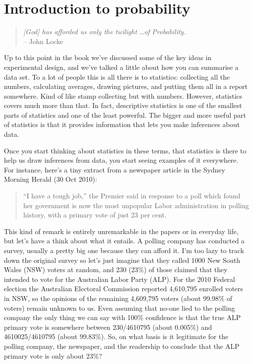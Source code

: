 

\chapter{Introduction to probability\label{ch:probability}}

\begin{quote}
{\it [God] has afforded us only the twilight \ldots of Probability.} \\
\hspace*{2cm} -- John Locke
\end{quote}

\vspace*{12pt}
Up to this point in the book we've discussed some of the key ideas in experimental design, and we've talked a little about how you can summarise a data set.  To a lot of people this is all there is to statistics: collecting all the numbers, calculating averages, drawing pictures, and putting them all in a report somewhere. Kind of like stamp collecting but with numbers. However, statistics covers much more than that. In fact, descriptive statistics is one of the smallest parts of statistics and one of the least powerful. The bigger and more useful part of statistics is that it provides information that lets you make inferences about data. 

Once you start thinking about statistics in these terms, that statistics is there to help us draw inferences from data, you start seeing examples of it everywhere. For instance, here's a tiny extract from a newspaper article in the Sydney Morning Herald (30 Oct 2010):

\begin{quote}
``I have a tough job,'' the Premier said in response to a poll which found her government is now the most unpopular Labor administration in polling history, with a primary vote of just 23 per cent.
\end{quote}

This kind of remark is entirely unremarkable in the papers or in everyday life, but let's have a think about what it entails. A polling company has conducted a survey, usually a pretty big one because they can afford it. I'm too lazy to track down the original survey so let's just imagine that they called 1000 New South Wales (NSW) voters at random, and 230 (23\%) of those claimed that they intended to vote for the Australian Labor Party (ALP). For the 2010 Federal election the Australian Electoral Commission reported 4,610,795 enrolled voters in NSW, so the opinions of the remaining 4,609,795 voters (about 99.98\% of voters) remain unknown to us. Even assuming that no-one lied to the polling company the only thing we can say with 100\% confidence is that the true ALP primary vote is somewhere between 230/4610795 (about 0.005\%) and 4610025/4610795 (about 99.83\%). So, on what basis is it legitimate for the polling company, the newspaper, and the readership to conclude that the ALP primary vote is only about 23\%?

